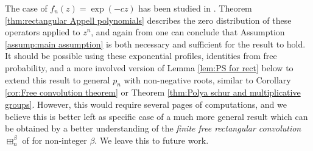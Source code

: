 \documentclass[reqno]{amsart}
\newcommand{\1}{\mathbf{1}}
\theoremstyle{plain}
\theoremstyle{definition}
\theoremstyle{remark}
\numberwithin{equation}{section}
\begin{document}
 The case of $f_n(z)=\exp(-cz)$ has been studied in \cite[Theorem 5.14, Case I]{Jalowy-Kabluchko-Marynych2025part2}. Theorem \ref{thm:rectangular Appell polynomials} describes the zero distribution of these operators applied to $z^n$, and again from \cite[Theorems 2.2 and 2.4]{Jalowy-Kabluchko-Marynych2025} one can conclude that Assumption \ref{assump:main assumption} is both necessary and sufficient for the result to hold. It should be possible using these exponential profiles, identities from free probability, and a more involved version of Lemma \ref{lem:PS for rect} below to extend this result to general $p_n$ with non-negative roots, similar to Corollary \ref{cor:Free convolution theorem} or Theorem \ref{thm:Polya schur and multiplicative groups}. However, this would require several pages of computations, and we believe this is better left as specific case of a much more general result which can be obtained by a better understanding of the \emph{finite free rectangular convolution} $\boxplus_{n}^{\beta}$ of \cite{Gribinski2024} for non-integer $\beta$. We leave this to future work.  
 
\end{document}
